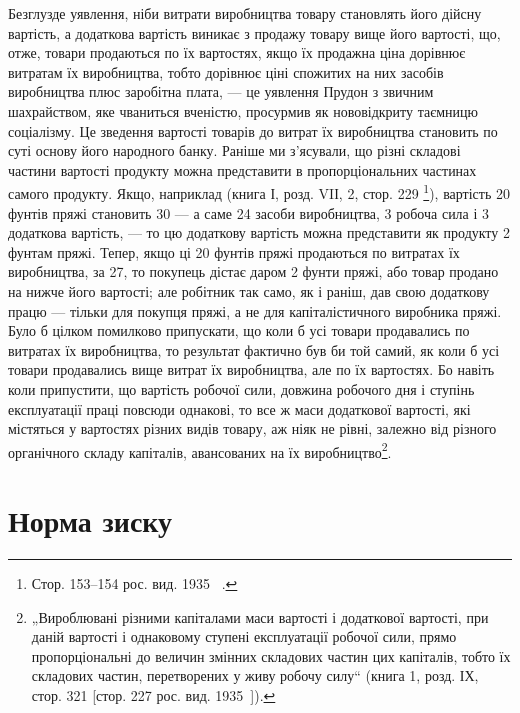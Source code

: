 
Безглузде уявлення, ніби витрати виробництва товару становлять
його дійсну вартість, а додаткова вартість виникає
з продажу товару вище його вартості, що, отже, товари продаються
по їх вартостях, якщо їх продажна ціна дорівнює витратам
їх виробництва, тобто дорівнює ціні спожитих на них
засобів виробництва плюс заробітна плата, — це уявлення Прудон
з звичним шахрайством, яке чваниться вченістю, просурмив
як нововідкриту таємницю соціалізму. Це зведення вартості
товарів до витрат їх виробництва становить по суті
основу його народного банку. Раніше ми з’ясували, що різні складові
частини вартості продукту можна представити в пропорціональних
частинах самого продукту. Якщо, наприклад (книга І,
розд. VIІ, 2, стор. 229 \footnote*{
Стор. 153--154 рос. вид. 1935~ .
}), вартість 20 фунтів пряжі становить
30 — а саме 24 засоби виробництва, 3
робоча сила і 3 додаткова вартість, — то цю додаткову
вартість можна представити як  продукту \deq{} 2 фунтам пряжі.
Тепер, якщо ці 20 фунтів пряжі продаються по витратах їх
виробництва, за 27, то покупець дістає даром 2 фунти
пряжі, або товар продано на   нижче його вартості; але робітник
так само, як і раніш, дав свою додаткову працю — тільки
для покупця пряжі, а не для капіталістичного виробника пряжі.
Було б цілком помилково припускати, що коли б усі товари
продавались по витратах їх виробництва, то результат фактично
був би той самий, як коли б усі товари продавались вище витрат
їх виробництва, але по їх вартостях. Бо навіть коли припустити,
що вартість робочої сили, довжина робочого дня
і ступінь експлуатації праці повсюди однакові, то все ж маси
додаткової вартості, які містяться у вартостях різних видів
товару, аж ніяк не рівні, залежно від різного органічного складу
капіталів, авансованих на їх виробництво\footnote{
„Вироблювані різними капіталами маси вартості і додаткової вартості, при
даній вартості і однаковому ступені експлуатації робочої сили, прямо пропорціональні
до величин змінних складових частин цих капіталів, тобто їх складових
частин, перетворених у живу робочу силу“ (книга 1, розд. ІХ, стор. 321
[стор. 227 рос. вид. 1935~]).
}.

\section{Норма зиску}

